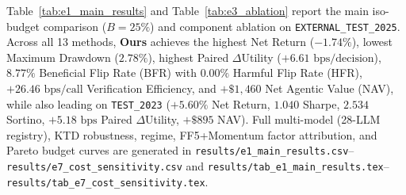 \documentclass[10pt,a4paper,twocolumn]{article}
\begin{document}
Table~\ref{tab:e1_main_results} and Table~\ref{tab:e3_ablation} report the main iso-budget comparison ($B = 25\%$) and component ablation on \texttt{EXTERNAL\_TEST\_2025}. Across all 13 methods, \textbf{Ours} achieves the highest Net Return ($-1.74\%$), lowest Maximum Drawdown ($2.78\%$), highest Paired $\Delta$Utility ($+6.61\text{ bps/decision}$), $8.77\%$ Beneficial Flip Rate (BFR) with $0.00\%$ Harmful Flip Rate (HFR), $+26.46\text{ bps/call}$ Verification Efficiency, and $+\$1,460$ Net Agentic Value (NAV), while also leading on \texttt{TEST\_2023} ($+5.60\%$ Net Return, $1.040$ Sharpe, $2.534$ Sortino, $+5.18\text{ bps}$ Paired $\Delta$Utility, $+\$895$ NAV). Full multi-model (28-LLM registry), KTD robustness, regime, FF5+Momentum factor attribution, and Pareto budget curves are generated in \texttt{results/e1\_main\_results.csv}--\texttt{results/e7\_cost\_sensitivity.csv} and \texttt{results/tab\_e1\_main\_results.tex}--\texttt{results/tab\_e7\_cost\_sensitivity.tex}.



\end{document}
